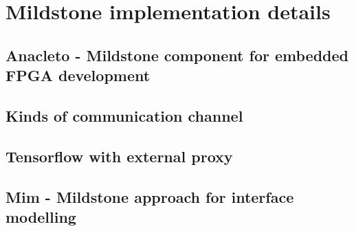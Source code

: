 \chapter{Mildstone implementation details}
\section{Anacleto - Mildstone component for embedded FPGA development}
\section{Kinds of communication channel}
\section{Tensorflow with external proxy}
\section{Mim - Mildstone approach for interface modelling}
